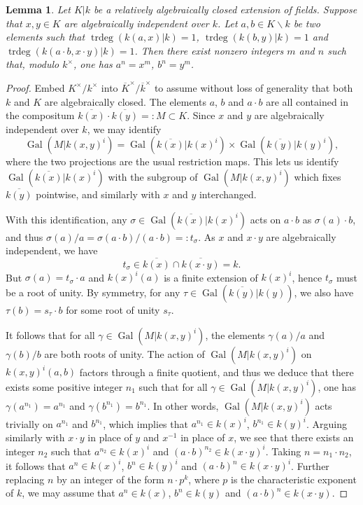\documentclass[12pt]{amsart}
\newcommand{\smin}{\smallsetminus}
\newcommand{\trdeg}{\operatorname{trdeg}}
\newcommand{\Gal}{\operatorname{Gal}}
\renewcommand{\bar}{\overline}
\newtheorem{lemma}[theorem]{Lemma}
\theoremstyle{definition}
\begin{document}
\begin{lemma}\label{lemma:acl_mul_compat}
  Let $K|k$ be a relatively algebraically closed extension of fields.
  Suppose that $x,y \in K$ are algebraically independent over $k$.
  Let $a,b \in K \smin k$ be two elements such that $\trdeg(k(a,x)|k) = 1$, $\trdeg(k(b,y)|k) = 1$ and $\trdeg(k(a \cdot b, x \cdot y)|k) = 1$.
  Then there exist nonzero integers $m$ and $n$ such that, modulo $k^{\times}$, one has $a^{n} = x^{m}$, $b^{n} = y^{m}$.
\end{lemma}
\begin{proof}
  Embed $K^{\times}/k^{\times}$ into $\bar K^{\times}/\bar k^{\times}$ to assume without loss of generality that both $k$ and $K$ are algebraically closed.
  The elements $a$, $b$ and $a \cdot b$ are all contained in the compositum $\bar{k(x)} \cdot \bar{k(y)} =: M \subset K$.
  Since $x$ and $y$ are algebraically independent over $k$, we may identify
  \[ \Gal(M|k(x,y)^{i}) = \Gal(\bar{k(x)}|k(x)^{i}) \times \Gal(\bar{k(y)}|k(y)^{i}), \]
  where the two projections are the usual restriction maps.
  This lets us identify $\Gal(\bar{k(x)}|k(x)^{i})$ with the subgroup of $\Gal(M|k(x,y)^{i})$ which fixes $\bar{k(y)}$ pointwise, and similarly with $x$ and $y$ interchanged.

  With this identification, any $\sigma \in \Gal(\bar{k(x)}|k(x)^{i})$ acts on $a \cdot b$ as $\sigma(a) \cdot b$, and thus $\sigma(a)/a = \sigma(a \cdot b)/(a \cdot b) =: t_{\sigma}$.
  As $x$ and $x \cdot y$ are algebraically independent, we have
  \[ t_{\sigma} \in \bar{k(x)} \cap \bar{k(x \cdot y)} = k. \]
  But $\sigma(a) = t_{\sigma} \cdot a$ and $k(x)^{i}(a)$ is a finite extension of $k(x)^{i}$, hence $t_{\sigma}$ must be a root of unity.
  By symmetry, for any $\tau \in \Gal(\bar{k(y)}|k(y))$, we also have $\tau(b) = s_{\tau} \cdot b$ for some root of unity $s_{\tau}$.

  It follows that for all $\gamma \in \Gal(M|k(x,y)^{i})$, the elements $\gamma(a)/a$ and $\gamma(b)/b$ are both roots of unity.
  The action of $\Gal(M|k(x,y)^{i})$ on $k(x,y)^{i}(a,b)$ factors through a finite quotient, and thus we deduce that there exists some positive integer $n_{1}$ such that for all $\gamma \in \Gal(M|k(x,y)^{i})$, one has $\gamma(a^{n_{1}}) = a^{n_{1}}$ and $\gamma(b^{n_{1}}) = b^{n_{1}}$.
  In other words, $\Gal(M|k(x,y)^{i})$ acts trivially on $a^{n_{1}}$ and $b^{n_{1}}$, which implies that $a^{n_{1}} \in k(x)^{i}$, $b^{n_{1}} \in k(y)^{i}$.
  Arguing similarly with $x \cdot y$ in place of $y$ and $x^{-1}$ in place of $x$, we see that there exists an integer $n_{2}$ such that $a^{n_{2}} \in k(x)^{i}$ and $(a \cdot b)^{n_{2}} \in k(x \cdot y)^{i}$.
  Taking $n = n_{1} \cdot n_{2}$, it follows that $a^{n} \in k(x)^{i}$, $b^{n} \in k(y)^{i}$ and $(a \cdot b)^{n} \in k(x \cdot y)^{i}$.
  Further replacing $n$ by an integer of the form $n \cdot p^{k}$, where $p$ is the characteristic exponent of $k$, we may assume that $a^{n} \in k(x)$, $b^{n} \in k(y)$ and $(a \cdot b)^{n} \in k(x \cdot y)$.


\end{proof}
\end{document}
